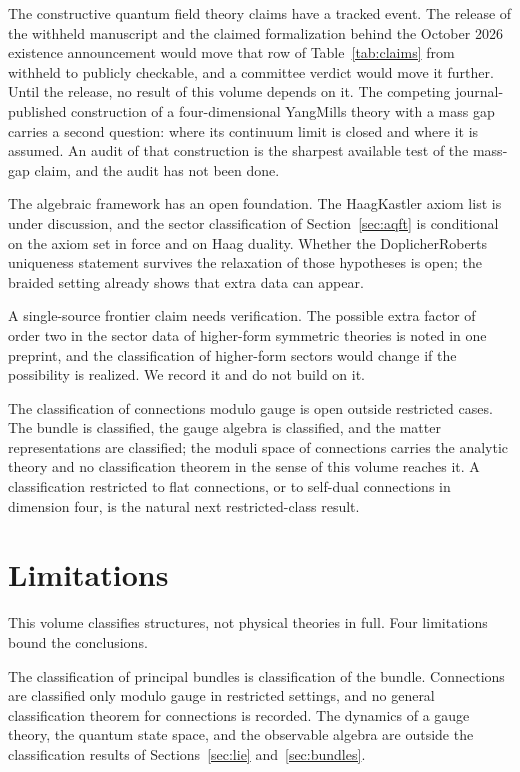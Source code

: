 \documentclass[11pt,letterpaper]{article}
\theoremstyle{definition}
\theoremstyle{remark}
\begin{document}
The constructive quantum field theory claims have a tracked event. The release of the withheld manuscript and the claimed formalization behind the October 2026 existence announcement would move that row of Table~\ref{tab:claims} from withheld to publicly checkable, and a committee verdict would move it further. Until the release, no result of this volume depends on it. The competing journal-published construction of a four-dimensional Yang\textendash{}Mills theory with a mass gap carries a second question: where its continuum limit is closed and where it is assumed. An audit of that construction is the sharpest available test of the mass-gap claim, and the audit has not been done.

The algebraic framework has an open foundation. The Haag\textendash{}Kastler axiom list is under discussion, and the sector classification of Section~\ref{sec:aqft} is conditional on the axiom set in force and on Haag duality. Whether the Doplicher\textendash{}Roberts uniqueness statement survives the relaxation of those hypotheses is open; the braided setting already shows that extra data can appear.

A single-source frontier claim needs verification. The possible extra factor of order two in the sector data of higher-form symmetric theories is noted in one preprint, and the classification of higher-form sectors would change if the possibility is realized. We record it and do not build on it.

The classification of connections modulo gauge is open outside restricted cases. The bundle is classified, the gauge algebra is classified, and the matter representations are classified; the moduli space of connections carries the analytic theory and no classification theorem in the sense of this volume reaches it. A classification restricted to flat connections, or to self-dual connections in dimension four, is the natural next restricted-class result.

\section{Limitations}
\label{sec:limitations}

This volume classifies structures, not physical theories in full. Four limitations bound the conclusions.

The classification of principal bundles is classification of the bundle. Connections are classified only modulo gauge in restricted settings, and no general classification theorem for connections is recorded. The dynamics of a gauge theory, the quantum state space, and the observable algebra are outside the classification results of Sections~\ref{sec:lie} and~\ref{sec:bundles}.
\end{document}
